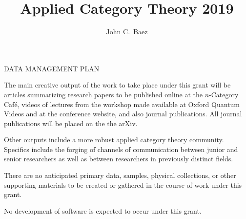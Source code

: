 \documentclass[12pt]{amsart}
\begin{document}
\centerline{\large DATA MANAGEMENT PLAN}
\title{Applied Category Theory 2019}
\author{John C.\ Baez}

\maketitle

The main creative output of the work to take place under this grant
will be articles summarizing research papers to be published
online at the $n$-Category Caf\'e, videos of lectures from the workshop
made available at Oxford Quantum Videos and at the conference website,
and also journal publications.  All journal publications will be placed on
the the arXiv.

Other outputs include a more robust applied category theory
community.  Specifics include the forging of channels of communication between junior
and senior researchers as well as between researchers in previously
distinct fields.  

There are no anticipated primary data, samples, physical collections,
or other supporting materials to be created or gathered in the course
of work under this grant.

No development of software is expected to occur under this grant.  
\end{document}
